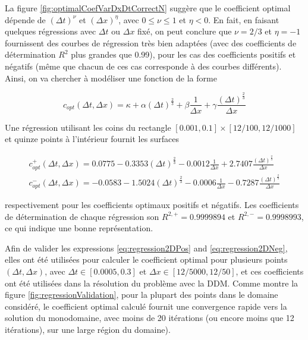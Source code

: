 \indent La figure \ref{fig:optimalCoefVarDxDtCorrectN} suggère que le coefficient optimal dépende de $(\Delta t)^\nu$ et $(\Delta x)^\eta$, avec $0 \leq \nu \leq 1$ et $\eta < 0$. En fait, en faisant quelques régressions avec $\Delta t $ ou $\Delta x$ fixé, on peut conclure que $\nu = 2/3$ et $\eta = -1$ fournissent des courbes de régression très bien adaptées (avec des coefficients de détermination $R^2$ plus grandes que 0.99), pour les cas des coefficients positifs et négatifs (même que chacun de ces cas corresponde à des courbes différents). Ainsi, on va chercher à modéliser une fonction de la forme

\begin{equation}
	\label{eq:regression2D}
	c_{opt}(\Delta t, \Delta x) = \kappa + \alpha (\Delta t)^{\frac{2}{3}} + \beta \frac{1}{\Delta x} + \gamma   \frac{(\Delta t)^{\frac{2}{3}}}{\Delta x}
\end{equation}

\indent Une régression utilisant les coins du rectangle $[0.001,0.1]\times[12/100,12/1000]$ et quinze points à l'intérieur fournit les surfaces 

\begin{gather}
	c_{opt}^+(\Delta t, \Delta x) = 0.0775 -0.3353 (\Delta t)^{\frac{2}{3}} - 0.0012 \frac{1}{\Delta x} + 2.7407   \frac{(\Delta t)^{\frac{2}{3}}}{\Delta x} 	\label{eq:regression2DPos} \\
	c_{opt}^-(\Delta t, \Delta x) = -0.0583 -1.5024 (\Delta t)^{\frac{2}{3}} - 0.0006 \frac{1}{\Delta x} -0.7287  \frac{(\Delta t)^{\frac{2}{3}}}{\Delta x} 	\label{eq:regression2DNeg}
\end{gather}

\noindent respectivement pour les coefficients optimaux positifs et négatifs. Les coefficients de détermination de chaque régression son $R^{2,+} = 0.9999894$ et $R^{2,-} = 0.9998993$, ce qui indique une bonne représentation.

\indent Afin de valider les expressions \eqref{eq:regression2DPos} and \eqref{eq:regression2DNeg}, elles ont été utilisées pour calculer le coefficient optimal pour plusieurs points $(\Delta t, \Delta x)$, avec $\Delta t \in [0.0005,0.3]$ et $\Delta x \in \left[12/5000,12/50 \right]$, et ces coefficients ont été utilisées dans la résolution du problème avec la DDM. Comme montre la figure \ref{fig:regressionValidation}, pour la plupart des points dans le domaine considéré, le coefficient optimal calculé fournit une convergence rapide vers la solution du monodomaine, avec moins de 20 itérations (ou encore moins que 12 itérations), sur une large région du domaine).

